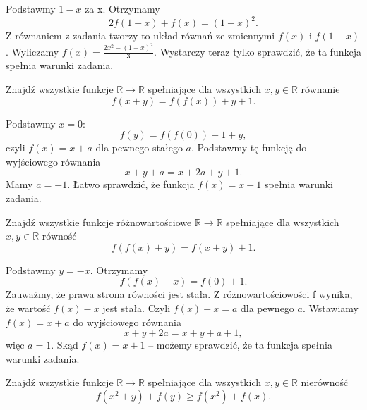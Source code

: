 
\noindent
Podstawmy $1-x$ za x. Otrzymamy 
\[ 
	2f(1 - x) + f(x) = (1 - x)^{2}.
\] 
Z równaniem z zadania tworzy to układ równań ze zmiennymi $f(x)$ i $f(1 - x)$. Wyliczamy $f(x) = \frac{2x^{2}-(1-x)^{2}} {3} $. Wystarczy teraz tylko sprawdzić, że ta funkcja spełnia warunki zadania. 

\vspace{5px}

\begin{problem}{5}
	Znajdź wszystkie funkcje $\mathbb{R} \rightarrow \mathbb{R} $ spełniające dla wszystkich $x, y \in \mathbb{R} $ równanie 
	\[
		f(x+y) = f(f(x)) + y + 1.
	\] 
\end{problem}


\noindent
Podstawmy $x = 0$: 
\[
 f(y) = f(f(0)) + 1 + y, 
\] 
czyli $f(x) = x + a$ dla pewnego stałego $a$. Podstawmy tę funkcję do wyjściowego równania
\[
	x+y+a=x+2a+y+1.
\] 
Mamy $a = -1$. Łatwo sprawdzić, że funkcja $f(x) = x - 1$ spełnia warunki zadania. 

\vspace{5px}

\begin{problem}{6}
	Znajdź wszystkie funkcje różnowartościowe
	$\mathbb{R} \rightarrow \mathbb{R} $ spełniające dla wszystkich $x, y \in \mathbb{R} $ równość 
	\[
		f(f(x) + y) = f(x+y) + 1.
	\]
\end{problem}


\noindent
Podstawmy $y = -x$. Otrzymamy 
\[ 
	f(f(x) - x) = f(0) + 1.
\] 
Zauważmy, że prawa strona równości jest stała. Z różnowartościowości f wynika, że wartość $f(x) - x$ jest stała. Czyli $f(x) - x = a$ dla pewnego $a$. Wstawiamy $f(x) = x + a$ do wyjściowego równania 
\[
	x + y + 2a = x + y + a + 1,
\]
więc $a = 1$. Skąd $f(x) = x + 1 $ -- możemy sprawdzić, że ta funkcja spełnia warunki zadania.

\newpage

\begin{problem}{7}
	Znajdź wszystkie funkcje 
	$\mathbb{R} \rightarrow \mathbb{R} $ spełniające dla wszystkich $x, y \in \mathbb{R} $ nierówność 
	\[
		f(x^2+y) + f(y) \geqslant f(x^2) + f(x).
	\] 
\end{problem}

